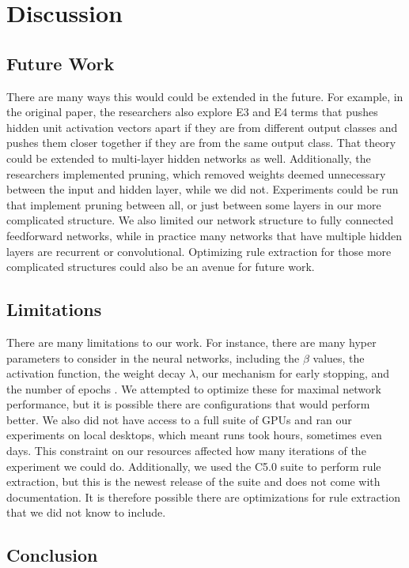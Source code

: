 \section{Discussion}
\label{sec:discussion}

\subsection{Future Work}
\label{sec:futurework}
There are many ways this would could be extended in the future. For
example, in the original paper, the researchers also explore E3 and E4
terms that pushes hidden unit activation vectors apart if they are from different
output classes and pushes them closer together if they are from the
same output class. That theory could be extended to multi-layer hidden
networks as well. Additionally, the researchers implemented pruning,
which removed weights deemed unnecessary between the input and hidden
layer, while we did not. Experiments could be run that implement
pruning between all, or just between some layers in our more
complicated structure. We also limited our network structure to fully
connected feedforward networks, while in practice many networks that
have multiple hidden layers are recurrent or convolutional. Optimizing
rule extraction for those more complicated structures could also be an
avenue for future work. 

\subsection{Limitations}
\label{sec:limitations}
There are many limitations to our work. For instance, there are many
hyper parameters to consider in the neural networks, including the
$\beta$ values, the activation function, the weight decay $\lambda$,
our mechanism for early stopping, and the number of epochs
. We attempted to optimize these for maximal network
performance, but it is possible there are configurations that would
perform better. We also did not have access to a full suite of GPUs
and ran our experiments on local desktops, which meant runs took
hours, sometimes even days. This constraint on our resources affected
how many iterations of the experiment we could do. Additionally, we
used the C5.0 suite to perform rule extraction, but this is the newest
release of the suite and does not come with documentation. It is
therefore possible there are optimizations for rule extraction that we
did not know to include.

\subsection{Conclusion}
\label{sec:conclusion}

